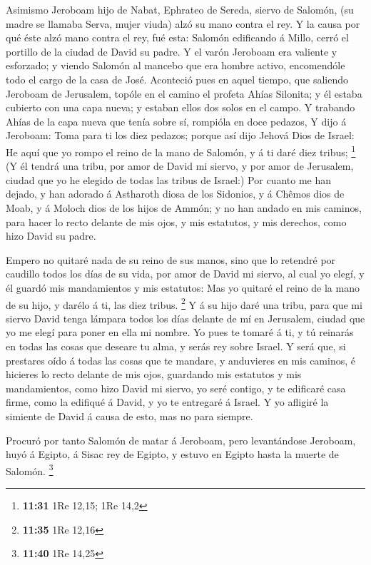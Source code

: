  Asimismo Jeroboam hijo de Nabat, Ephrateo de Sereda,
siervo de Salomón, (su madre se llamaba Serva, mujer viuda) alzó su mano
contra el rey.  Y la causa por qué éste alzó mano contra
el rey, fué esta: Salomón edificando á Millo, cerró el portillo de la
ciudad de David su padre.  Y el varón Jeroboam era
valiente y esforzado; y viendo Salomón al mancebo que era hombre activo,
encomendóle todo el cargo de la casa de José.  Aconteció
pues en aquel tiempo, que saliendo Jeroboam de Jerusalem, topóle en el
camino el profeta Ahías Silonita; y él estaba cubierto con una capa
nueva; y estaban ellos dos solos en el campo.  Y trabando
Ahías de la capa nueva que tenía sobre sí, rompióla en doce pedazos,
 Y dijo á Jeroboam: Toma para ti los diez pedazos; porque
así dijo Jehová Dios de Israel: He aquí que yo rompo el reino de la mano
de Salomón, y á ti daré diez tribus; \footnote{\textbf{11:31} 1Re 12,15;
  1Re 14,2}  (Y él tendrá una tribu, por amor de David mi
siervo, y por amor de Jerusalem, ciudad que yo he elegido de todas las
tribus de Israel:)  Por cuanto me han dejado, y han
adorado á Astharoth diosa de los Sidonios, y á Chêmos dios de Moab, y á
Moloch dios de los hijos de Ammón; y no han andado en mis caminos, para
hacer lo recto delante de mis ojos, y mis estatutos, y mis derechos,
como hizo David su padre.

 Empero no quitaré nada de su reino de sus manos, sino
que lo retendré por caudillo todos los días de su vida, por amor de
David mi siervo, al cual yo elegí, y él guardó mis mandamientos y mis
estatutos:  Mas yo quitaré el reino de la mano de su
hijo, y darélo á ti, las diez tribus. \footnote{\textbf{11:35} 1Re 12,16}
 Y á su hijo daré una tribu, para que mi siervo David
tenga lámpara todos los días delante de mí en Jerusalem, ciudad que yo
me elegí para poner en ella mi nombre.  Yo pues te tomaré
á ti, y tú reinarás en todas las cosas que deseare tu alma, y serás rey
sobre Israel.  Y será que, si prestares oído á todas las
cosas que te mandare, y anduvieres en mis caminos, é hicieres lo recto
delante de mis ojos, guardando mis estatutos y mis mandamientos, como
hizo David mi siervo, yo seré contigo, y te edificaré casa firme, como
la edifiqué á David, y yo te entregaré á Israel.  Y yo
afligiré la simiente de David á causa de esto, mas no para siempre.

 Procuró por tanto Salomón de matar á Jeroboam, pero
levantándose Jeroboam, huyó á Egipto, á Sisac rey de Egipto, y estuvo en
Egipto hasta la muerte de Salomón. \footnote{\textbf{11:40} 1Re 14,25}

